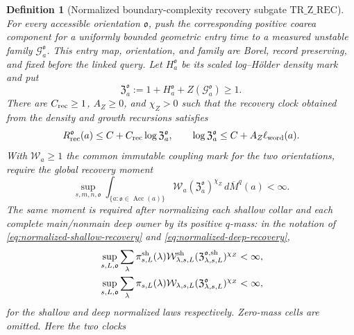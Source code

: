 \documentclass[11pt]{article}
\newtheorem{definition}[theorem]{Definition}
\begin{document}
\begin{definition}[Normalized boundary-complexity recovery subgate
$\mathrm{TR\_Z\_REC}$]
\label{def:translation-Z-recovery}
For every accessible orientation $\mathfrak o$, push the corresponding
positive coarea component for a uniformly bounded geometric entry time to a
measured unstable family $\mathcal G_a^{\mathfrak o}$.  This entry map,
orientation, and family are Borel, record preserving, and fixed before the
linked query.  Let $H_a^{\mathfrak o}$ be its scaled log--H\"older density
mark and put
\begin{equation}
\label{eq:translation-combined-Z-mark}
 \mathfrak Z_a^{\mathfrak o}:=
 1+H_a^{\mathfrak o}+Z(\mathcal G_a^{\mathfrak o})\ge1.
\end{equation}
There are $C_{\rm rec}\ge1$, $A_Z\ge0$, and $\chi_Z>0$ such that the
recovery clock obtained from the density and growth recursions satisfies
\begin{equation}
\label{eq:translation-Z-recovery-clock}
 R_{\rm rec}^{\mathfrak o}(a)
 \le C+C_{\rm rec}\log\mathfrak Z_a^{\mathfrak o},
 \qquad
 \log\mathfrak Z_a^{\mathfrak o}
 \le C+A_Z\ell_{\rm word}(a).
\end{equation}
With $\mathcal W_a\ge1$ the common immutable coupling mark for the two
orientations, require the global recovery moment
\begin{equation}
\label{eq:translation-global-Z-moment}
 \sup_{s,m,n,\mathfrak o}
 \int_{\{a:\mathfrak o\in\operatorname{Acc}(a)\}}
 \mathcal W_a
 (\mathfrak Z_a^{\mathfrak o})^{\chi_Z}\,
 d\overline M^q(a)<\infty.
\end{equation}
The same moment is required after normalizing each shallow collar and each
complete main/nonmain deep owner by its positive $q$-mass: in the notation
of \eqref{eq:normalized-shallow-recovery} and
\eqref{eq:normalized-deep-recovery},
\begin{equation}
\label{eq:translation-normalized-Z-moment}
 \begin{split}
 &\sup_{s,L,\mathfrak o}
 \sum_\lambda\pi^{\rm sh}_{s,L}(\lambda)
 \mathcal W_{\lambda,s,L}^{\rm sh}
 (\mathfrak Z_{\lambda,s,L}^{\mathfrak o,\rm sh})^{\chi_Z}<\infty,\\
 &\sup_{s,L,\mathfrak o}
 \sum_\lambda\pi_{s,L}(\lambda)
 \mathcal W_{\lambda,s,L}
 (\mathfrak Z_{\lambda,s,L}^{\mathfrak o})^{\chi_Z}<\infty,
 \end{split}
\end{equation}
for the shallow and deep normalized laws respectively.  Zero-mass cells
are omitted.  Here the two clocks

\end{definition}
\end{document}
